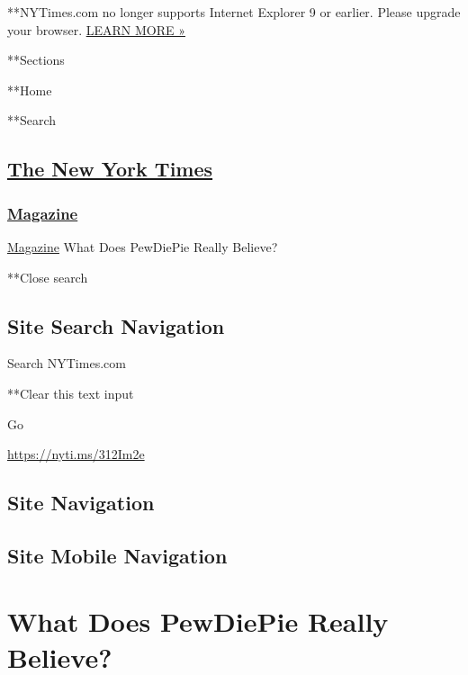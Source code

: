 **NYTimes.com no longer supports Internet Explorer 9 or earlier. Please
upgrade your browser.
\href{http://www.nytimes3xbfgragh.onion/content/help/site/ie9-support.html}{LEARN
MORE »}

**Sections

**Home

**Search

\hypertarget{the-new-york-times}{%
\subsection{\texorpdfstring{\href{http://www.nytimes3xbfgragh.onion/}{The
New York Times}}{The New York Times}}\label{the-new-york-times}}

\hypertarget{-magazine-}{%
\subsubsection{\texorpdfstring{
\href{https://www.nytimes3xbfgragh.onion/section/magazine}{Magazine}
}{ Magazine }}\label{-magazine-}}

 \href{https://www.nytimes3xbfgragh.onion/section/magazine}{Magazine}
\textbar{}What Does PewDiePie Really Believe?

**Close search

\hypertarget{site-search-navigation}{%
\subsection{Site Search Navigation}\label{site-search-navigation}}

Search NYTimes.com

**Clear this text input

Go

\url{https://nyti.ms/312Im2e}

\hypertarget{site-navigation}{%
\subsection{Site Navigation}\label{site-navigation}}

\hypertarget{site-mobile-navigation}{%
\subsection{Site Mobile Navigation}\label{site-mobile-navigation}}

\hypertarget{what-does-pewdiepie-really-believe}{%
\section{What Does PewDiePie Really
Believe?}\label{what-does-pewdiepie-really-believe}}

